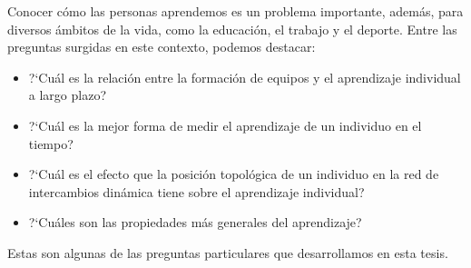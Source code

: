 \documentclass[a4paper,11pt]{book}
\theoremstyle{definition}
\begin{document}

Conocer c\'omo las personas aprendemos es un problema importante, adem\'as, para diversos \'ambitos de la vida, como la educaci\'on, el trabajo y el deporte.
Entre las preguntas surgidas en este contexto, podemos destacar:
\begin{itemize}
\item ?`Cu\'al es la relaci\'on entre la formaci\'on de equipos y el aprendizaje individual a largo plazo?

\item ?`Cu\'al es la mejor forma de medir el aprendizaje de un individuo en el tiempo?

\item ?`Cu\'al es el efecto que la posici\'on topol\'ogica de un individuo en la red de intercambios din\'amica tiene sobre el aprendizaje individual?

\item ?`Cu\'ales son las propiedades m\'as generales del aprendizaje?

\end{itemize}
Estas son algunas de las preguntas particulares que desarrollamos en esta tesis.
\end{document}
